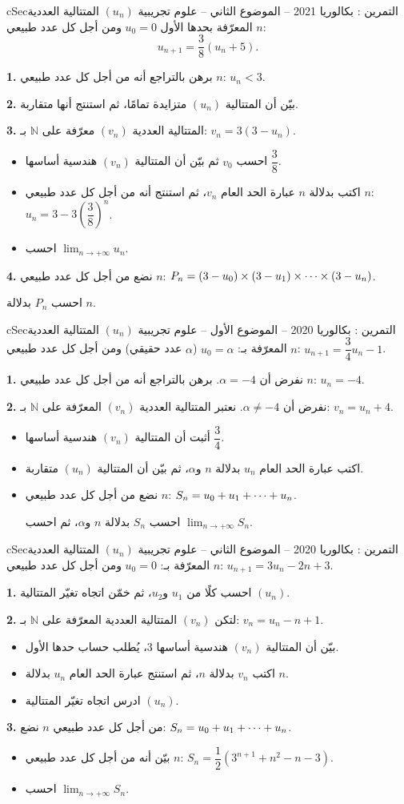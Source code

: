 \documentclass[12pt,a4paper]{article}
\newenvironment{BOX}[2]{\begin{otherlanguage}{english}\begin{arbox}{#1}{#2}}{\end{arbox}\end{otherlanguage}}
\newcounter{exo}
\newenvironment{tamrin}[1]{\stepcounter{exo}\begin{BOX}{cSec}{التمرين \theexo: #1}}{\end{BOX}}
\renewcommand{\cdots}{\mathinner{\cdotp\cdotp\cdotp}}
\newcommand{\N}{\mathbb{N}}
\newcommand{\limn}{\displaystyle\lim_{n\to+\infty}}
\newenvironment{sq}{\begin{itemize}[leftmargin=2.4em,itemsep=3pt]}{\end{itemize}}
\newcommand{\qa}{\item[(أ)]}\newcommand{\qb}{\item[(ب)]}\newcommand{\qc}{\item[(جـ)]}\newcommand{\qd}{\item[(د)]}\newcommand{\qe}{\item[(هـ)]}
\newcommand{\QQ}[1]{\par\smallskip\textbf{#1.} }
\begin{document}

\begin{tamrin}{بكالوريا 2021 -- الموضوع الثاني -- علوم تجريبية}
$(u_n)$ المتتالية العددية المعرّفة بحدها الأول $u_0=0$ ومن أجل كل عدد طبيعي $n$:
\[u_{n+1}=\frac{3}{8}\left(u_n+5\right).\]
\QQ{1} برهن بالتراجع أنه من أجل كل عدد طبيعي $n$: $u_n<3$.
\QQ{2} بيّن أن المتتالية $(u_n)$ متزايدة تمامًا، ثم استنتج أنها متقاربة.
\QQ{3} المتتالية العددية $(v_n)$ معرّفة على $\N$ بـ: $v_n=3\left(3-u_n\right)$.
\begin{sq}
\qa احسب $v_0$ ثم بيّن أن المتتالية $(v_n)$ هندسية أساسها $\dfrac{3}{8}$.
\qb اكتب بدلالة $n$ عبارة الحد العام $v_n$، ثم استنتج أنه من أجل كل عدد طبيعي $n$: $u_n=3-3\left(\dfrac{3}{8}\right)^n$.
\qc احسب $\limn u_n$.
\end{sq}
\QQ{4} نضع من أجل كل عدد طبيعي $n$: $P_n=\left(3-u_0\right)\times\left(3-u_1\right)\times\cdots\times\left(3-u_n\right)$.

احسب $P_n$ بدلالة $n$.
\end{tamrin}

\begin{tamrin}{بكالوريا 2020 -- الموضوع الأول -- علوم تجريبية}
$(u_n)$ المتتالية العددية المعرّفة بـ: $u_0=\alpha$ ($\alpha$ عدد حقيقي) ومن أجل كل عدد طبيعي $n$: $u_{n+1}=\dfrac{3}{4}u_n-1$.
\QQ{1} نفرض أن $\alpha=-4$. برهن بالتراجع أنه من أجل كل عدد طبيعي $n$: $u_n=-4$.
\QQ{2} نفرض أن $\alpha\neq-4$. نعتبر المتتالية العددية $(v_n)$ المعرّفة على $\N$ بـ: $v_n=u_n+4$.
\begin{sq}
\qa أثبت أن المتتالية $(v_n)$ هندسية أساسها $\dfrac{3}{4}$.
\qb اكتب عبارة الحد العام $u_n$ بدلالة $n$ و$\alpha$، ثم بيّن أن المتتالية $(u_n)$ متقاربة.
\qc نضع من أجل كل عدد طبيعي $n$: $S_n=u_0+u_1+\cdots+u_n$.

احسب $S_n$ بدلالة $n$ و$\alpha$، ثم احسب $\limn S_n$.
\end{sq}
\end{tamrin}

\begin{tamrin}{بكالوريا 2020 -- الموضوع الثاني -- علوم تجريبية}
$(u_n)$ المتتالية العددية المعرّفة بـ: $u_0=0$ ومن أجل كل عدد طبيعي $n$: $u_{n+1}=3u_n-2n+3$.
\QQ{1} احسب كلًا من $u_1$ و$u_2$، ثم خمّن اتجاه تغيّر المتتالية $(u_n)$.
\QQ{2} لتكن $(v_n)$ المتتالية العددية المعرّفة على $\N$ بـ: $v_n=u_n-n+1$.
\begin{sq}
\qa بيّن أن المتتالية $(v_n)$ هندسية أساسها $3$، يُطلب حساب حدها الأول.
\qb اكتب $v_n$ بدلالة $n$، ثم استنتج عبارة الحد العام $u_n$ بدلالة $n$.
\qc ادرس اتجاه تغيّر المتتالية $(u_n)$.
\end{sq}
\QQ{3} من أجل كل عدد طبيعي $n$ نضع: $S_n=u_0+u_1+\cdots+u_n$.
\begin{sq}
\qa بيّن أنه من أجل كل عدد طبيعي $n$: $S_n=\dfrac{1}{2}\left(3^{n+1}+n^2-n-3\right)$.
\qb احسب $\limn S_n$.
\end{sq}
\end{tamrin}
\end{document}
